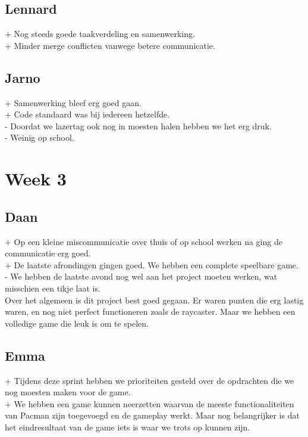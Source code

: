 \documentclass{article}
\begin{document}
\subsection{Lennard} %
\label{sub:lennard}
+ Nog steeds goede taakverdeling en samenwerking.\\
+ Minder merge conflicten vanwege betere communicatie.

\subsection{Jarno} %
\label{sub:jarno}
+ Samenwerking bleef erg goed gaan.\\
+ Code standaard was bij iedereen hetzelfde.\\
- Doordat we lazertag ook nog in moesten halen hebben we het erg druk.\\
- Weinig op school.

\section{Week 3} %
\label{sec:week_3}

\subsection{Daan} %
\label{sub:daan}
+ Op een kleine miscommunicatie over thuis of op school werken na ging de communicatie erg goed.\\
+ De laatste afrondingen gingen goed. We hebben een complete speelbare game.\\
- We hebben de laatste avond nog wel aan het project moeten werken, wat misschien een tikje laat is.\\
Over het algemeen is dit project best goed gegaan. Er waren punten die erg lastig waren, en nog niet perfect functioneren zoals de raycaster. Maar we hebben een volledige game die leuk is om te spelen.

\subsection{Emma} %
\label{sub:emma}
+ Tijdens deze sprint hebben we prioriteiten gesteld over de opdrachten die we nog moesten maken voor de game.\\
+ We hebben een game kunnen neerzetten waarvan de meeste functionaliteiten van Pacman zijn toegevoegd en de gameplay werkt. Maar nog belangrijker is dat het eindresultaat van de game iets is waar we trots op kunnen zijn.\\
\end{document}
